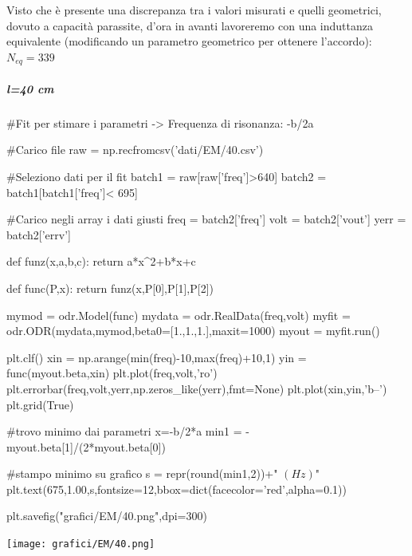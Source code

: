 Visto che è presente una discrepanza tra i valori misurati e quelli geometrici, dovuto a capacità parassite, d'ora in avanti lavoreremo con una induttanza equivalente (modificando un parametro geometrico per ottenere l'accordo): $N_{eq} = 339$

\subparagraph*{l=40 cm}

\begin{sagesilent}

 #Fit per stimare i parametri -> Frequenza di risonanza: -b/2a

#Carico file
raw = np.recfromcsv('dati/EM/40.csv')

#Seleziono dati per il fit
batch1 = raw[raw['freq']>640]
batch2 = batch1[batch1['freq']< 695]

#Carico negli array i dati giusti
freq = batch2['freq']
volt = batch2['vout']
yerr = batch2['errv']


def funz(x,a,b,c):
    return a*x^2+b*x+c

def func(P,x):
    return funz(x,P[0],P[1],P[2])

mymod = odr.Model(func)
mydata = odr.RealData(freq,volt)
myfit = odr.ODR(mydata,mymod,beta0=[1.,1.,1.],maxit=1000)
myout = myfit.run()

plt.clf()
xin = np.arange(min(freq)-10,max(freq)+10,1)
yin = func(myout.beta,xin)
plt.plot(freq,volt,'ro')
plt.errorbar(freq,volt,yerr,np.zeros_like(yerr),fmt=None)
plt.plot(xin,yin,'b--')
plt.grid(True)

#trovo minimo dai parametri x=-b/2*a
min1 = -myout.beta[1]/(2*myout.beta[0]) 

#stampo minimo su grafico
s = repr(round(min1,2))+" $(Hz)$"
plt.text(675,1.00,s,fontsize=12,bbox=dict(facecolor='red',alpha=0.1))

plt.savefig("grafici/EM/40.png",dpi=300)
 
\end{sagesilent}

\texttt{[image: grafici/EM/40.png]}

